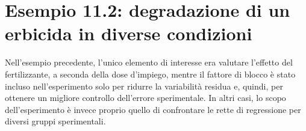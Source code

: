 \documentclass[
  12pt,
]{book}
\newenvironment{Shaded}{\begin{snugshade}}{\end{snugshade}}
\newcommand{\AttributeTok}[1]{\textcolor[rgb]{0.77,0.63,0.00}{#1}}
\newcommand{\CommentTok}[1]{\textcolor[rgb]{0.56,0.35,0.01}{\textit{#1}}}
\newcommand{\DecValTok}[1]{\textcolor[rgb]{0.00,0.00,0.81}{#1}}
\newcommand{\DocumentationTok}[1]{\textcolor[rgb]{0.56,0.35,0.01}{\textbf{\textit{#1}}}}
\newcommand{\FloatTok}[1]{\textcolor[rgb]{0.00,0.00,0.81}{#1}}
\newcommand{\FunctionTok}[1]{\textcolor[rgb]{0.00,0.00,0.00}{#1}}
\newcommand{\NormalTok}[1]{#1}
\newcommand{\OtherTok}[1]{\textcolor[rgb]{0.56,0.35,0.01}{#1}}
\newcommand{\SpecialCharTok}[1]{\textcolor[rgb]{0.00,0.00,0.00}{#1}}
\newcommand{\StringTok}[1]{\textcolor[rgb]{0.31,0.60,0.02}{#1}}
\begin{document}
\begin{Shaded}
\end{Shaded}

\normalsize

\hypertarget{esempio-11.2-degradazione-di-un-erbicida-in-diverse-condizioni}{%
\section{Esempio 11.2: degradazione di un erbicida in diverse condizioni}\label{esempio-11.2-degradazione-di-un-erbicida-in-diverse-condizioni}}

Nell'esempio precedente, l'unico elemento di interesse era valutare l'effetto del fertilizzante, a seconda della dose d'impiego, mentre il fattore di blocco è stato incluso nell'esperimento solo per ridurre la variabilità residua e, quindi, per ottenere un migliore controllo dell'errore sperimentale. In altri casi, lo scopo dell'esperimento è invece proprio quello di confrontare le rette di regressione per diversi gruppi sperimentali.
\end{document}
